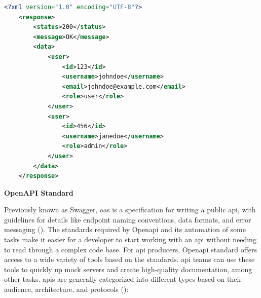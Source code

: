 \begin{lstlisting}[language=XML, caption=Example of a XML response, label=lst:xmlresponse]
    <?xml version="1.0" encoding="UTF-8"?>
    <response>
        <status>200</status>
        <message>OK</message>
        <data>
            <user>
                <id>123</id>
                <username>johndoe</username>
                <email>johndoe@example.com</email>
                <role>user</role>
            </user>
            <user>
                <id>456</id>
                <username>janedoe</username>
                <role>admin</role>
            </user>
        </data>
    </response>
\end{lstlisting}

\textbf{OpenAPI Standard}

Previously known as Swagger, \acrshort{oas} is a specification for writing a public \acrshort{api}, with
guidelines for details like endpoint naming conventions, data formats, and error messaging
(\cite{openapistandard}). The standards required by Open\acrshort{api} and its automation of some tasks
make it easier for a developer to start working with an \acrshort{api} without needing to read through
a complex code base. For \acrshort{api} producers, Open\acrshort{api} standard offers access to a wide
variety of tools based on the standards. \acrshort{api} teams can use these tools to quickly up mock
servers and create high-quality documentation, among other tasks.
\acrshort{api}s are generally categorized into different types based on their audience, architecture, and
protocols (\cite{typesofapi}):

